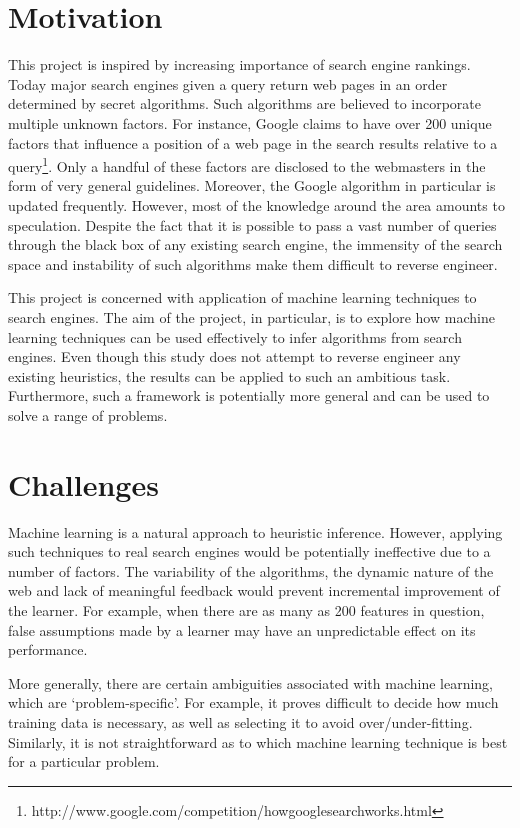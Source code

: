 \documentclass[12pt,notitlepage,twoside]{scrreprt}
\begin{document}
\section{Motivation}
This project is inspired by increasing importance of search engine rankings.
Today major search engines given a query return web pages in an order
determined by secret algorithms. Such algorithms are believed 
to incorporate multiple unknown factors.
For instance, Google claims to have over 200 unique factors that influence a
position of a web page in the search results relative to a query\footnote{http://www.google.com/competition/howgooglesearchworks.html}. Only
a handful of these factors are disclosed to the webmasters  in the form of very
general guidelines. Moreover, the Google algorithm in particular is updated
frequently. However, most of the knowledge around the area amounts to
speculation. Despite the fact that it is possible to pass a vast number of
queries through the black box of any existing search engine, the immensity of
the search space and instability of such algorithms make them difficult to
reverse engineer.

This project is concerned with application of machine learning techniques to
search engines. The aim of the project, in particular,  is to explore how
machine learning techniques can be used effectively to infer algorithms from
search engines. 
Even though this study does not attempt to reverse engineer any existing
heuristics, the results can be applied to such an ambitious task.
Furthermore, such a framework is potentially more general and can be used to solve a
range of problems.

\section{Challenges}
Machine learning is a natural approach to heuristic inference. However, applying such
techniques to real search engines would be potentially ineffective due to a number of
factors. The variability of the  algorithms, the dynamic nature of the web and lack of
meaningful feedback would prevent incremental improvement of the learner. For example,
when there are as many as 200 features in question, false assumptions made by a learner
may have an unpredictable effect on its performance.

More generally, there are certain ambiguities associated with machine learning, which are
`problem-specific'. For example, it proves difficult to decide how much training data is
necessary, as well as selecting it to avoid over/under-fitting\cite{domingos}. Similarly,
it is not straightforward as to which machine learning technique is best for a particular
problem.
\end{document}
